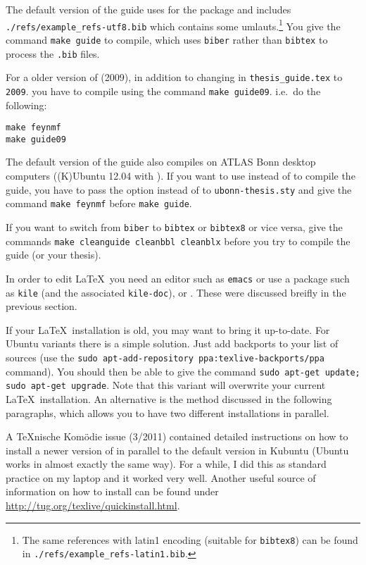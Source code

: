 The default version of the guide uses  for the
 package and includes
\texttt{./refs/example\_refs-utf8.bib} which contains some umlauts.\footnote{%
The same references with latin1 encoding (suitable for \texttt{bibtex8}) can be found in
\texttt{./refs/example\_refs-latin1.bib}.}
You give the command \texttt{make guide} to compile, which uses \texttt{biber} rather than
\texttt{bibtex} to process the \texttt{.bib} files.

For a older version of \TeXLive (2009), in addition to changing
 in \texttt{thesis\_guide.tex} to \texttt{2009}.
you have to compile using the command \texttt{make guide09}.
i.e.\ do the following:
\begin{verbatim}
make feynmf
make guide09
\end{verbatim}

The default version of the guide also compiles on ATLAS Bonn desktop
computers ((K)Ubuntu 12.04 with ). If you want to use
 instead of  to compile the guide, you
have to pass the option  instead of  to \texttt{ubonn-thesis.sty} 
and give the command \texttt{make feynmf} before \texttt{make guide}.

If you want to switch from \texttt{biber} to
\texttt{bibtex} or \texttt{bibtex8} or vice versa, give the commands
\texttt{make cleanguide cleanbbl cleanblx} before you try to compile
the guide (or your thesis).

In order to edit \LaTeX\ you need an editor such as \texttt{emacs} or
use a package such as \texttt{kile} (and the associated
\texttt{kile-doc}), \TeXstudio or \TeXmaker. These were discussed
breifly in the previous section.

If your \LaTeX\ installation is old, you may want to bring it
up-to-date.  For Ubuntu variants there is a simple solution. Just add
\TeXLive backports to your list of sources (use the \texttt{sudo
  apt-add-repository ppa:texlive-backports/ppa} command). You should
then be able to give the command \texttt{sudo apt-get update; sudo
  apt-get upgrade}. Note that this variant will overwrite your current
\LaTeX\ installation. An alternative is the method discussed in the
following paragraphs, which allows you to have two different installations in
parallel.

A \TeX nische Komödie issue (3/2011) contained detailed instructions on
how to install a newer version of \TeXLive in parallel to the
default version in Kubuntu (Ubuntu works in almost exactly the
same way). 
For a while, I did this as standard practice on my laptop and it worked very well.
Another useful source of information on how to install \TeXLive can be found under
\url{http://tug.org/texlive/quickinstall.html}.

